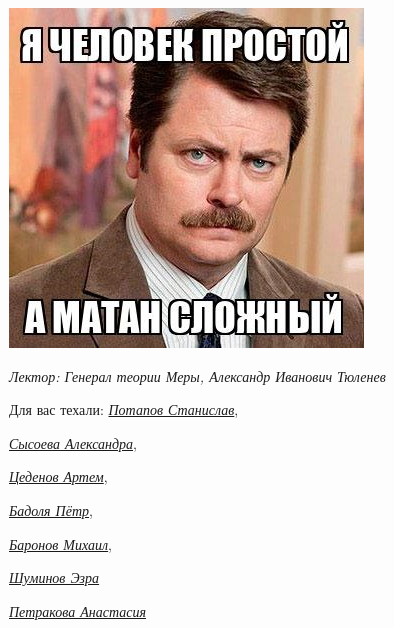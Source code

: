 \begin{titlepage}
\begin{minipage}{0.3\textwidth}
        \end{minipage}
    \begin{minipage}{0.365\textwidth}
    \includegraphics[width=\textwidth]{images/mem2.jpg}
    \end{minipage}
    \vspace{10pt}

 
 
     \textit{\large{Лектор: Генерал теории Меры, Александр Иванович Тюленев}
} 

	\vfill
	\begin{flushright}
    \noindent
    Для вас техали: \href{https://vk.com/invader17}{\textit{Потапов Станислав}}, 
  
    \href{https://vk.com/salexame}{\textit{ Сысоева Александра}}, 
    
    \href{https://vk.com/darkness11235}{\textit{ Цеденов Артем}},  
    
    \href{https://vk.com/akzium}{\textit{Бадоля Пётр}},
    
    \href{https://vk.com/id389655743}{\textit{Баронов Михаил}},

    \href{https://t.me/YamSuf}{\textit{Шуминов Эзра}}
    
    \href{https://vk.com/prizrakkota}{\textit{Петракова Анастасия}}
  
	\end{flushright}


	\pagebreak
\end{titlepage}